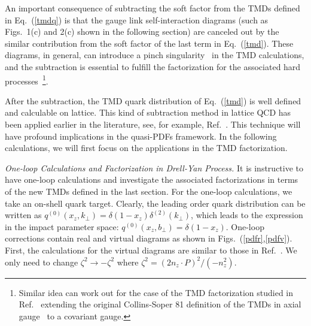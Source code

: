 \documentclass[aps,prd,preprint,tightenlines,superscriptaddress,nofootinbib]{revtex4}
\begin{document}
An important consequence of subtracting the soft factor from the TMDs
defined in Eq.~(\ref{tmdq}) is that the gauge link self-interaction diagrams 
(such as Figs.~1(c) and 2(c) shown in the following section) are canceled out by the similar
contribution from the soft factor of the last term in Eq.~(\ref{tmd}). These
diagrams, in general, can introduce a pinch singularity~\cite{bbdm}
in the TMD calculations, and the subtraction is essential to fulfill the
factorization for the associated hard processes~\footnote{
Similar idea can work out for the case of the TMD 
factorization studied in Ref.~\cite{bbdm} extending the original Collins-Soper
81 definition of the TMDs in axial gauge~\cite{Collins:1981uk} to a
covariant gauge.}.

After the subtraction, the TMD quark distribution of Eq.~(\ref{tmd}) is well 
defined and calculable on lattice. This kind of subtraction method
in lattice QCD has been applied earlier in the literature, see, for example,
Ref.~\cite{Creutz:1980wj}. This technique will have profound implications
in the quasi-PDFs framework. In the following calculations, we will first 
focus on the applications in the TMD factorization. 

{\it One-loop Calculations and Factorization in Drell-Yan Process.}
It is instructive to have one-loop calculations and investigate the associated
factorizations in terms of the new TMDs defined in the last section. 
For the one-loop calculations, we take an on-shell quark target. Clearly, the leading order
quark distribution can be written as
$q^{(0)}(x_z,k_\perp)=\delta (1-x_z)\delta^{(2)}(k_\perp)$, which leads to the 
expression in the impact parameter space: $q^{(0)}(x_z,b_\perp)=\delta(1-x_z) $.
One-loop corrections contain real and virtual diagrams as shown in Figs.~(\ref{pdfr},\ref{pdfv}).
First, the calculations for the virtual diagrams are similar to those in Ref.~\cite{Ji:2004wu,Sun:2013dya}.
We only need to change $\zeta^2\to -\zeta^2$ where $\zeta^2=(2n_z\cdot P)^2/(-n_z^2)$.
\end{document}
